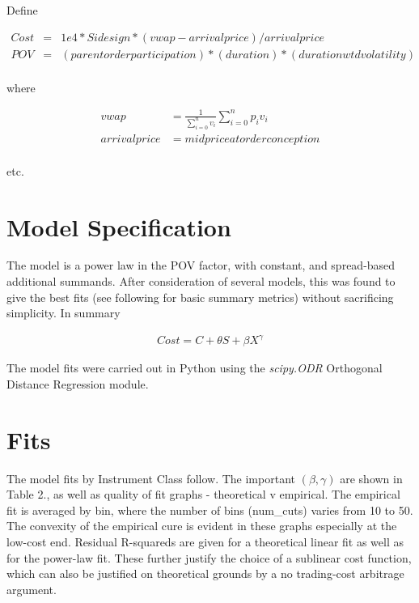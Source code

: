 \documentclass{article}
\begin{document}
Define

\begin{align}
Cost &=& 1e4 * Sidesign * (vwap - arrival price)/arrival price\\
POV &=& (parent order participation) * (duration) * (duration wtd volatility)\\
\end{align}

where

\begin{align}
vwap &= \frac{1}{\sum_{i=0}^{n}v_i}\sum_{i=0}^{n}p_i v_i\\
arrival price &= midprice at order conception\\
\end{align}

etc.

\section*{Model Specification}

The model is a power law in the POV factor, with constant, and spread-based additional summands. After consideration of several models, this was found to give the best fits (see following for basic summary metrics) without sacrificing simplicity. In summary

\begin{align}
Cost = C + \theta S + \beta X^{\gamma} 
\end{align}

The model fits were carried out in Python using the {\em scipy.ODR} Orthogonal Distance Regression module.

\section*{Fits}

The model fits by Instrument Class follow. The important $\left(\beta , \gamma\right)$  are shown in Table 2., as well as quality of fit graphs - theoretical v empirical. The empirical fit is averaged by bin, where the number of bins (num\_cuts) varies from 10 to 50. The convexity of the empirical cure is evident in these graphs especially at the low-cost end. Residual R-squareds are given for a theoretical linear fit as well as for the power-law fit. These further justify the choice of a sublinear cost function, which can also be justified on theoretical grounds by a no trading-cost arbitrage argument.
\end{document}

